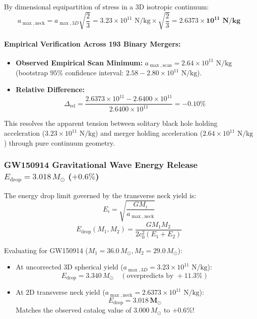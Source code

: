 \documentclass[11pt,a4paper]{article}
\begin{document}
By dimensional equipartition of stress in a 3D isotropic continuum:
\begin{equation}
a_{\max,\text{neck}} = a_{\max,3D} \sqrt{\frac{2}{3}} = 3.23 \times 10^{11}\text{ N/kg} \times \sqrt{\frac{2}{3}} = \mathbf{2.6373 \times 10^{11}\text{ N/kg}}
\label{eq:a_max_neck_val}
\end{equation}

\paragraph{Empirical Verification Across 193 Binary Mergers:}
\begin{itemize}
    \item \textbf{Observed Empirical Scan Minimum:} $a_{\max,\text{scan}} = 2.64 \times 10^{11}\text{ N/kg}$ (bootstrap $95\%$ confidence interval: $2.58 - 2.80 \times 10^{11}\text{ N/kg}$).
    \item \textbf{Relative Difference:}
    \begin{equation}
    \Delta_{\text{rel}} = \frac{2.6373 \times 10^{11} - 2.6400 \times 10^{11}}{2.6400 \times 10^{11}} = \mathbf{-0.10\%}
    \end{equation}
\end{itemize}
This resolves the apparent tension between solitary black hole holding acceleration ($3.23 \times 10^{11}\text{ N/kg}$) and merger holding acceleration ($2.64 \times 10^{11}\text{ N/kg}$) through pure continuum geometry.

\subsubsection{GW150914 Gravitational Wave Energy Release $E_{\text{drop}} = 3.018\,M_\odot$ ($+0.6\%$)}
\label{subsubsec:gw150914_energy_release}

The energy drop limit governed by the transverse neck yield is:
\begin{equation}
E_i = \sqrt{\frac{G M_i}{a_{\max,\text{neck}}}}
\end{equation}
\begin{equation}
E_{\text{drop}}(M_1, M_2) = \frac{G M_1 M_2}{2 c_0^2 (E_1 + E_2)}
\label{eq:e_drop_formula}
\end{equation}

Evaluating for GW150914 ($M_1 = 36.0\,M_\odot, M_2 = 29.0\,M_\odot$):
\begin{itemize}
    \item At uncorrected 3D spherical yield ($a_{\max,3D} = 3.23 \times 10^{11}\text{ N/kg}$):
    \begin{equation}
    E_{\text{drop}} = 3.340\,M_\odot \quad (\text{overpredicts by } +11.3\%)
    \end{equation}
    \item At 2D transverse neck yield ($a_{\max,\text{neck}} = 2.6373 \times 10^{11}\text{ N/kg}$):
    \begin{equation}
    E_{\text{drop}} = \mathbf{3.018\,M_\odot}
    \end{equation}
    Matches the observed catalog value of $3.000\,M_\odot$ to \textbf{$+0.6\%$}!
\end{itemize}
\end{document}
